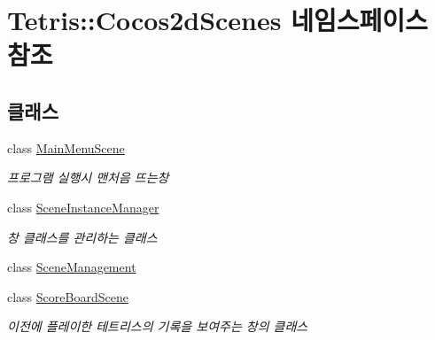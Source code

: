 \hypertarget{namespace_tetris_1_1_cocos2d_scenes}{}\section{Tetris\+:\+:Cocos2d\+Scenes 네임스페이스 참조}
\label{namespace_tetris_1_1_cocos2d_scenes}
\subsection*{클래스}
\begin{DoxyCompactItemize}
\item 
class \hyperlink{class_tetris_1_1_cocos2d_scenes_1_1_main_menu_scene}{Main\+Menu\+Scene}
\begin{DoxyCompactList}\small\item\em 프로그램 실행시 맨처음 뜨는창 \end{DoxyCompactList}\item 
class \hyperlink{class_tetris_1_1_cocos2d_scenes_1_1_scene_instance_manager}{Scene\+Instance\+Manager}
\begin{DoxyCompactList}\small\item\em 창 클래스를 관리하는 클래스 \end{DoxyCompactList}\item 
class \hyperlink{class_tetris_1_1_cocos2d_scenes_1_1_scene_management}{Scene\+Management}
\item 
class \hyperlink{class_tetris_1_1_cocos2d_scenes_1_1_score_board_scene}{Score\+Board\+Scene}
\begin{DoxyCompactList}\small\item\em 이전에 플레이한 테트리스의 기록을 보여주는 창의 클래스 \end{DoxyCompactList}\end{DoxyCompactItemize}
